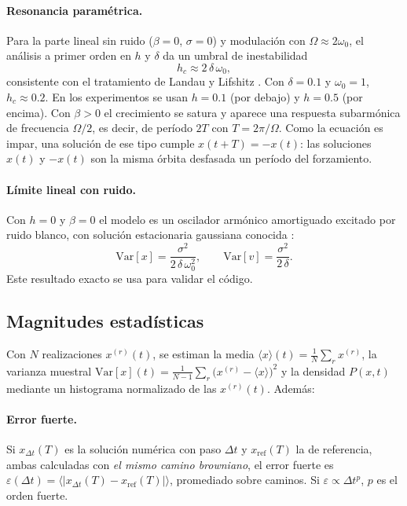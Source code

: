 \documentclass[12pt,a4paper]{article}
\newcommand{\media}[1]{\langle #1\rangle}
\begin{document}
\paragraph{Resonancia paramétrica.} Para la parte lineal sin ruido ($\beta=0$, $\sigma=0$) y modulación con $\Omega\approx2\omega_0$, el análisis a primer orden en $h$ y $\delta$ da un umbral de inestabilidad
\begin{equation}
    h_c \approx 2\,\delta\,\omega_0,
    \label{eq:umbral}
\end{equation}
consistente con el tratamiento de Landau y Lifshitz \cite{landau1976}. Con $\delta=0.1$ y $\omega_0=1$, $h_c\approx0.2$. En los experimentos se usan $h=0.1$ (por debajo) y $h=0.5$ (por encima). Con $\beta>0$ el crecimiento se satura y aparece una respuesta subarmónica de frecuencia $\Omega/2$, es decir, de período $2T$ con $T=2\pi/\Omega$. Como la ecuación es impar, una solución de ese tipo cumple $x(t+T)=-x(t)$: las soluciones $x(t)$ y $-x(t)$ son la misma órbita desfasada un período del forzamiento.

\paragraph{Límite lineal con ruido.} Con $h=0$ y $\beta=0$ el modelo es un oscilador armónico amortiguado excitado por ruido blanco, con solución estacionaria gaussiana conocida \cite{gardiner2009}:
\begin{equation}
    \mathrm{Var}[x]=\frac{\sigma^{2}}{2\,\delta\,\omega_0^{2}},\qquad
    \mathrm{Var}[v]=\frac{\sigma^{2}}{2\,\delta}.
    \label{eq:ou}
\end{equation}
Este resultado exacto se usa para validar el código.

\subsection{Magnitudes estadísticas}

Con $N$ realizaciones $x^{(r)}(t)$, se estiman la media $\media{x}(t)=\frac1N\sum_r x^{(r)}$, la varianza muestral $\mathrm{Var}[x](t)=\frac{1}{N-1}\sum_r\big(x^{(r)}-\media{x}\big)^{2}$ y la densidad $P(x,t)$ mediante un histograma normalizado de las $x^{(r)}(t)$. Además:

\paragraph{Error fuerte.} Si $x_{\Delta t}(T)$ es la solución numérica con paso $\Delta t$ y $x_{\mathrm{ref}}(T)$ la de referencia, ambas calculadas con \emph{el mismo camino browniano}, el error fuerte es $\varepsilon(\Delta t)=\media{|x_{\Delta t}(T)-x_{\mathrm{ref}}(T)|}$, promediado sobre caminos. Si $\varepsilon\propto\Delta t^{p}$, $p$ es el orden fuerte.
\end{document}
